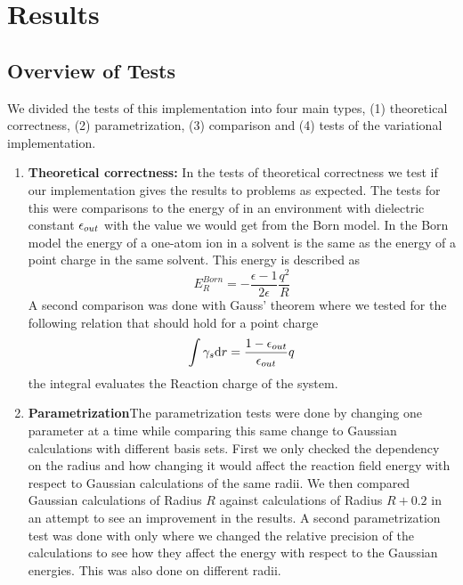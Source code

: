 \documentclass[../master_thesis.tex]{subfiles}
\begin{document}
\chapter{Results}\label{chap:Results}
\section{Overview of Tests}
We divided the tests of this implementation into four main types, (1) theoretical
correctness, (2) parametrization, (3) comparison and (4) tests of the variational implementation.
\begin{enumerate}

\item \textbf{Theoretical correctness:}
In the tests of theoretical correctness we test if our implementation gives the
results to problems as expected. The tests for this were comparisons to
the energy of   in an environment with dielectric constant $\epsilon_{out}$
with the value we would get from the Born model. In the Born model the energy of a  %
one-atom ion in a solvent is the same as the energy of a point charge in the same solvent.
This energy is described as \cite{Tomasi:1994wt}
\begin{equation}\label{eq:bornenergy}
  E_{R}^{Born} =-\frac{\epsilon-1}{2 \epsilon} \frac{q^{2}}{R}
\end{equation}
A second comparison was done with Gauss' theorem\cite{Sorland} where we tested for the
following relation that should hold for a point charge
\begin{equation}\label{eq:Reactioncharge}
  \int \gamma_s \text{d}r= \frac{1 - \epsilon_{out} }{\epsilon_{out}} q
\end{equation}
the integral evaluates the Reaction charge of the system.

\item \textbf{Parametrization}The parametrization tests were done by changing one parameter at a time while
comparing this same change to Gaussian calculations with different basis sets.
First we only checked the dependency on the radius and how changing it would
affect the reaction field energy with respect to Gaussian calculations of the same
radii. We then compared Gaussian calculations of Radius $R$ against \mrchem
calculations of Radius $R+0.2$ in an attempt to see an improvement in the
results.
A second parametrization test was done with only 
where we changed the relative precision of the \mrchem calculations to see how
they affect the energy with respect to the Gaussian energies. This was also done
on different radii.


\end{enumerate}
\end{document}

